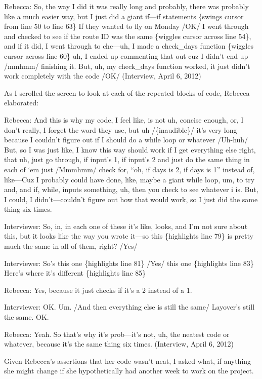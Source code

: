 Rebecca: So, the way I did it was really long and probably, there was
probably like a much easier way, but I just did a giant if---if
statements \{swings cursor from line 50 to line 63\} If they wanted to
fly on Monday /OK/ I went through and checked to see if the route ID was
the same \{wiggles cursor across line 54\}, and if it did, I went
through to che---uh, I made a check\_days function \{wiggles cursor
across line 60\} uh, I ended up commenting that out cuz I didn't end up
/mmhmm/ finishing it. But, uh, my check\_days function worked, it just
didn't work completely with the code /OK/ (Interview, April 6, 2012)

As I scrolled the screen to look at each of the repeated blocks of code,
Rebecca elaborated:

Rebecca: And this is why my code, I feel like, is not uh, concise
enough, or, I don't really, I forget the word they use, but uh
/\{inaudible\}/ it's very long because I couldn't figure out if I should
do a while loop or whatever /Uh-huh/ But, so I was just like, I know
this way should work if I get everything else right, that uh, just go
through, if input's 1, if input's 2 and just do the same thing in each
of `em just /Mmmhmm/ check for, ``oh, if days is 2, if days is 1''
instead of, like---Cuz I probably could have done, like, maybe a giant
while loop, um, to try and, and if, while, inputs something, uh, then
you check to see whatever i is. But, I could, I didn't---couldn't figure
out how that would work, so I just did the same thing six times.

Interviewer: So, in, in each one of these it's like, looks, and I'm not
sure about this, but it looks like the way you wrote it---so this
\{highlights line 79\} is pretty much the same in all of them, right?
/Yes/

Interviewer: So's this one \{highlights line 81\} /Yes/ this one
\{highlights line 83\} Here's where it's different \{highlights line
85\}

Rebecca: Yes, because it just checks if it's a 2 instead of a 1.

Interviewer: OK. Um. /And then everything else is still the same/
Layover's still the same. OK.

Rebecca: Yeah. So that's why it's prob---it's not, uh, the neatest code
or whatever, because it's the same thing six times. (Interview, April 6,
2012)

Given Rebecca's assertions that her code wasn't neat, I asked what, if
anything she might change if she hypothetically had another week to work
on the project.

